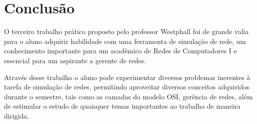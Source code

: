 \documentclass[brazil,times,12pt]{abnt}
\begin{document}
\section*{Conclusão}
O terceiro trabalho prático proposto pelo professor Westphall foi de grande
valia para o aluno adquirir habilidade com uma ferramenta de simulação de rede,
um conhecimento importante para um acadêmico de Redes de Computadores I e
essencial para um aspirante a gerente de redes.

Através desse trabalho o aluno pode experimentar diversos problemas inerentes à
tarefa de simulação de redes, permitindo aproveitar diversos conceitos
adquiridos durante o semestre, tais como as camadas do modelo OSI, gerência de
redes, além de estimular o estudo de quaisquer temas importantes ao
trabalho de maneira dirigida.



\end{document}
